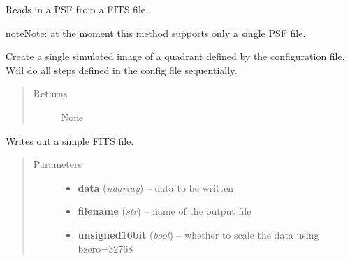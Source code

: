 \documentclass[a4paper,12pt,english]{sphinxmanual}
\begin{document}
\begin{fulllineitems}
\begin{fulllineitems}
\label{simulator:simulator.simulator.VISsimulator.readPSFs}
Reads in a PSF from a FITS file.

\begin{notice}{note}{Note:}
at the moment this method supports only a single PSF file.
\end{notice}

\end{fulllineitems}


\begin{fulllineitems}
\label{simulator:simulator.simulator.VISsimulator.simulate}
Create a single simulated image of a quadrant defined by the configuration file.
Will do all steps defined in the config file sequentially.
\begin{quote}\begin{description}
\item[{Returns}] \leavevmode
None

\end{description}\end{quote}

\end{fulllineitems}


\begin{fulllineitems}
\label{simulator:simulator.simulator.VISsimulator.writeFITSfile}
Writes out a simple FITS file.
\begin{quote}\begin{description}
\item[{Parameters}] \leavevmode\begin{itemize}
\item {} 
\textbf{data} (\emph{ndarray}) -- data to be written

\item {} 
\textbf{filename} (\emph{str}) -- name of the output file

\item {} 
\textbf{unsigned16bit} (\emph{bool}) -- whether to scale the data using bzero=32768

\end{itemize}


\end{description}
\end{quote}
\end{fulllineitems}
\end{fulllineitems}
\end{document}
